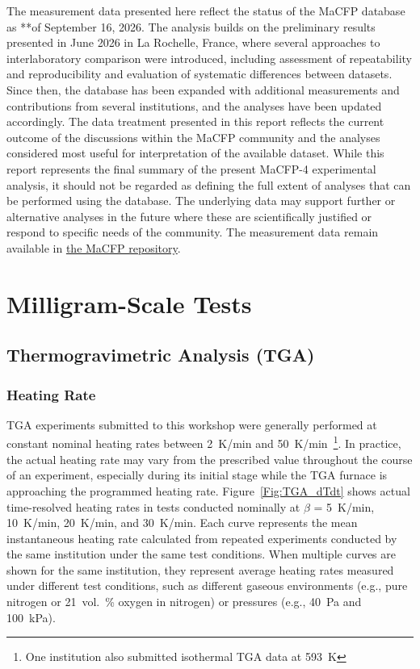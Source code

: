 \documentclass{book}
\begin{document}
The measurement data presented here reflect the status of the MaCFP database as **of September 16, 2026. The analysis builds on the preliminary results presented in June 2026 in La Rochelle, France, where several approaches to interlaboratory comparison were introduced, including assessment of repeatability and reproducibility and evaluation of systematic differences between datasets. Since then, the database has been expanded with additional measurements and contributions from several institutions, and the analyses have been updated accordingly. The data treatment presented in this report reflects the current outcome of the discussions within the MaCFP community and the analyses considered most useful for interpretation of the available dataset. While this report represents the final summary of the present MaCFP-4 experimental analysis, it should not be regarded as defining the full extent of analyses that can be performed using the database. The underlying data may support further or alternative analyses in the future where these are scientifically justified or respond to specific needs of the community. The measurement data remain available in \href{https://github.com/MaCFP/matl-db/tree/master/Wood/Calibration_Data}{the MaCFP repository}.

\section{Milligram-Scale Tests}

\subsection{Thermogravimetric Analysis (TGA)}
\label{TGA_analysis}

\subsubsection{Heating Rate}

TGA experiments submitted to this workshop were generally performed at constant nominal heating rates between 2~K/min and 50~K/min~\footnote{One institution also submitted isothermal TGA data at 593~K}. In practice, the actual heating rate may vary from the prescribed value throughout the course of an experiment, especially during its initial stage while the TGA furnace is approaching the programmed heating rate. Figure~\ref{Fig:TGA_dTdt} shows actual time-resolved heating rates in tests conducted nominally at $\beta$ = 5~K/min, 10~K/min, 20~K/min, and 30~K/min. Each curve represents the mean instantaneous heating rate calculated from repeated experiments conducted by the same institution under the same test conditions. When multiple curves are shown for the same institution, they represent average heating rates measured under different test conditions, such as different gaseous environments (e.g., pure nitrogen or 21~vol.~\% oxygen in nitrogen) or pressures (e.g., 40~Pa and 100~kPa).
\end{document}
